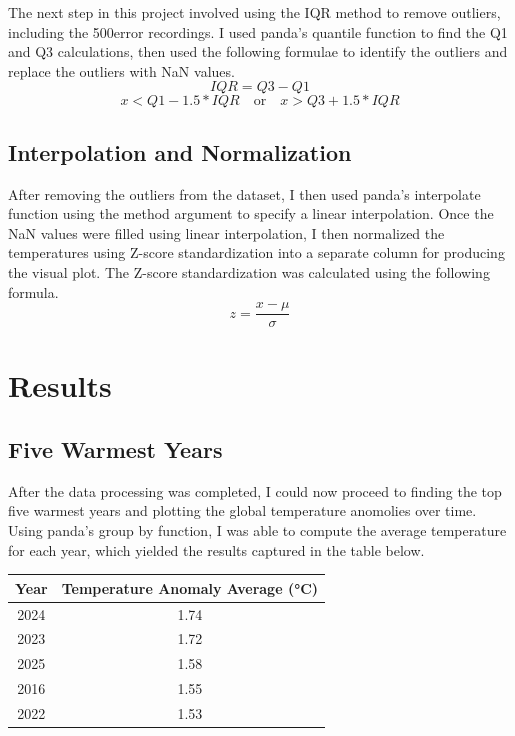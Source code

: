 \documentclass[conference]{IEEEtran}
\begin{document}
The next step in this project involved using the IQR method to remove outliers, including the 500error recordings. I used panda's quantile function to find the Q1 and Q3 calculations, then used the following formulae to identify the outliers and replace the outliers with NaN values.
\[IQR=Q3-Q1\]
\[x<Q1-1.5*IQR\quad \text{or} \quad x>Q3+1.5*IQR\]

\subsection{Interpolation and Normalization}

After removing the outliers from the dataset, I then used panda's interpolate function using the method argument to specify a linear interpolation. Once the NaN values were filled using linear interpolation, I then normalized the temperatures using Z-score standardization into a separate column for producing the visual plot. The Z-score standardization was calculated using the following formula.
\[z=\frac{x-\mu}{\sigma}\]

\section{Results}

\subsection{Five Warmest Years}
After the data processing was completed, I could now proceed to finding the top five warmest years and plotting the global temperature anomolies over time. Using panda's group by function, I was able to compute the average temperature for each year, which yielded the results captured in the table below. 

\begin{table}[h]
    \centering
    \begin{tabular}{c c}
        \toprule
        Year & Temperature Anomaly Average (°C) \\
        \midrule
        2024 & 1.74 \\
        2023 & 1.72 \\
        2025 & 1.58 \\
        2016 & 1.55 \\
        2022 & 1.53 \\
        \bottomrule
    \end{tabular}
\end{table}
\end{document}
